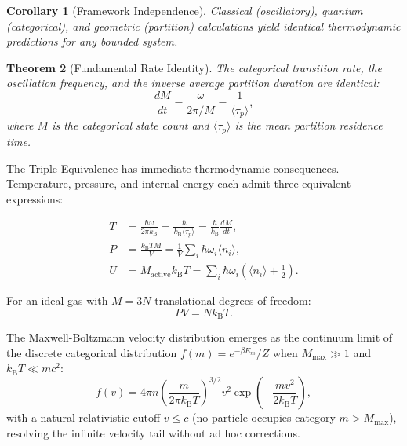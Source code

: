 \documentclass[twocolumn,10pt]{article}
\newtheorem{theorem}{Theorem}[section]
\newtheorem{corollary}[theorem]{Corollary}
\theoremstyle{definition}
\newcommand{\kB}{k_{\mathrm{B}}}
\begin{document}
\begin{corollary}[Framework Independence]\label{cor:framework}
Classical (oscillatory), quantum (categorical), and geometric (partition) calculations yield identical thermodynamic predictions for any bounded system.
\end{corollary}

\begin{theorem}[Fundamental Rate Identity]\label{thm:rate}
The categorical transition rate, the oscillation frequency, and the inverse average partition duration are identical:
\begin{equation}\label{eq:rate_identity}
    \frac{dM}{dt} = \frac{\omega}{2\pi/M} = \frac{1}{\langle\tau_p\rangle},
\end{equation}
where $M$ is the categorical state count and $\langle\tau_p\rangle$ is the mean partition residence time.
\end{theorem}

The Triple Equivalence has immediate thermodynamic consequences. Temperature, pressure, and internal energy each admit three equivalent expressions:

\begin{align}
    T &= \frac{\hbar\omega}{2\pi\kB} = \frac{\hbar}{\kB\langle\tau_p\rangle} = \frac{\hbar}{\kB}\frac{dM}{dt}, \label{eq:temperature} \\
    P &= \frac{\kB T M}{V} = \frac{1}{V}\sum_i \hbar\omega_i\langle n_i\rangle, \label{eq:pressure} \\
    U &= M_{\mathrm{active}}\kB T = \sum_i \hbar\omega_i\left(\langle n_i\rangle + \tfrac{1}{2}\right). \label{eq:internal_energy}
\end{align}

For an ideal gas with $M = 3N$ translational degrees of freedom:
\begin{equation}\label{eq:ideal_gas}
    PV = N\kB T.
\end{equation}

The Maxwell-Boltzmann velocity distribution emerges as the continuum limit of the discrete categorical distribution $f(m) = e^{-\beta E_m}/Z$ when $M_{\max} \gg 1$ and $\kB T \ll mc^2$:
\begin{equation}\label{eq:maxwell_boltzmann}
    f(v) = 4\pi n\left(\frac{m}{2\pi\kB T}\right)^{3/2} v^2 \exp\left(-\frac{mv^2}{2\kB T}\right),
\end{equation}
with a natural relativistic cutoff $v \leq c$ (no particle occupies category $m > M_{\max}$), resolving the infinite velocity tail without ad hoc corrections.
\end{document}
